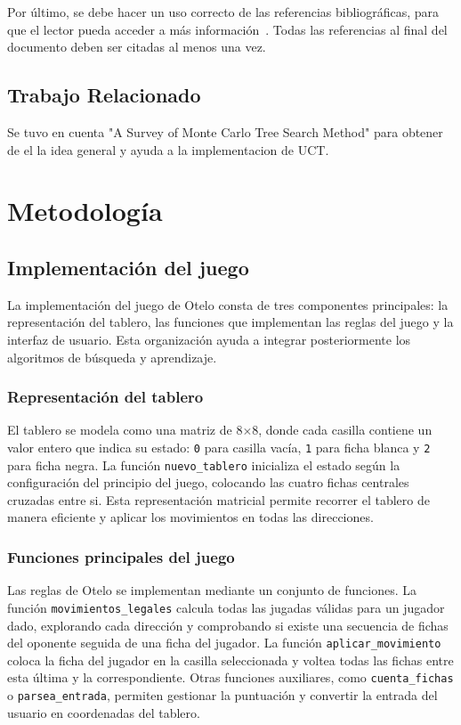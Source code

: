 \documentclass[conference,a4paper]{IEEEtran}
\begin{document}
Por último, se debe hacer un uso correcto de las referencias bibliográficas,
para que el lector pueda acceder a más información~\cite{b2}. Todas las
referencias al final del documento deben ser citadas al menos una vez.


\subsection{\textbf{Trabajo Relacionado}}

Se tuvo en cuenta "A Survey of Monte Carlo Tree Search Method" para obtener de el la idea general y ayuda a la implementacion de UCT.

\section{Metodología}\label{sec:Metodologia}

\subsection{\textbf{Implementación del juego}}

La implementación del juego de Otelo consta de tres componentes principales: la representación del tablero, las funciones que implementan las reglas del juego y la interfaz de usuario. Esta organización ayuda a integrar posteriormente los algoritmos de búsqueda y aprendizaje.

\subsubsection{\textbf{Representación del tablero}}

El tablero se modela como una matriz de 8$\times$8, donde cada casilla contiene un valor entero que indica su estado: \texttt{0} para casilla vacía, \texttt{1} para ficha blanca y \texttt{2} para ficha negra. La función \texttt{nuevo\_tablero} inicializa el estado según la configuración del principio del juego, colocando las cuatro fichas centrales cruzadas entre si. Esta representación matricial permite recorrer el tablero de manera eficiente y aplicar los movimientos en todas las direcciones.

\subsubsection{\textbf{Funciones principales del juego}}

Las reglas de Otelo se implementan mediante un conjunto de funciones. La función \texttt{movimientos\_legales} calcula todas las jugadas válidas para un jugador dado, explorando cada dirección y comprobando si existe una secuencia de fichas del oponente seguida de una ficha del jugador. La función \texttt{aplicar\_movimiento} coloca la ficha del jugador en la casilla seleccionada y voltea todas las fichas entre esta última y la correspondiente. Otras funciones auxiliares, como \texttt{cuenta\_fichas} o \texttt{parsea\_entrada}, permiten gestionar la puntuación y convertir la entrada del usuario en coordenadas del tablero.
\end{document}
